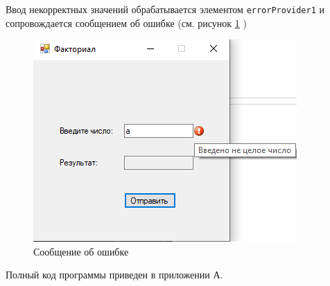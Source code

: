 Ввод некорректных значений обрабатывается элементом \verb|errorProvider1| и 
сопровождается сообщением об ошибке (см. рисунок \ref{fig:error1} )
\begin{figure}[H]
    \centering
    \includegraphics{task1/error.png}
    \caption{Сообщение об ошибке}
    \label{fig:error1}
\end{figure}
Полный код программы приведен в приложении А.